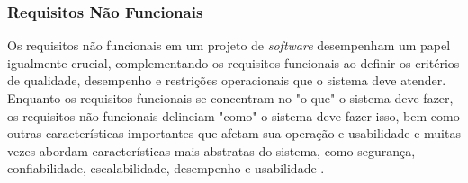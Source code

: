         
\subsubsection{Requisitos Não Funcionais}

Os requisitos não funcionais em um projeto de \textit{software} desempenham um papel igualmente crucial, complementando os requisitos funcionais ao definir os critérios de qualidade, desempenho e restrições operacionais que o sistema deve atender. Enquanto os requisitos funcionais se concentram no "o que" o sistema deve fazer, os requisitos não funcionais delineiam "como" o sistema deve fazer isso, bem como outras características importantes que afetam sua operação e usabilidade e muitas vezes abordam características mais abstratas do sistema, como segurança, confiabilidade, escalabilidade, desempenho e usabilidade \cite{softwareengreq}. 
            
